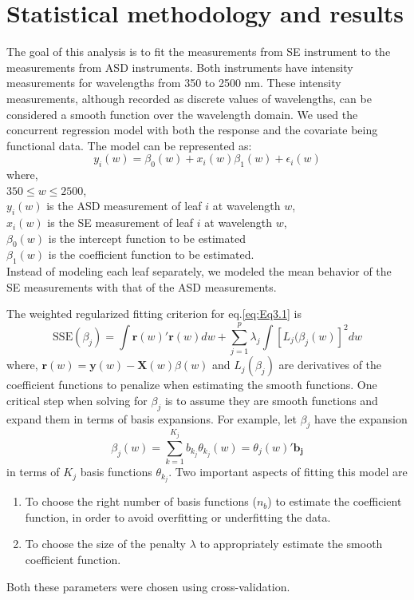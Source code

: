 \section*{Statistical methodology and results} \label{Sec_Methods}

The goal of this analysis is to fit the measurements from SE instrument to the measurements from ASD instruments. Both instruments have intensity measurements for wavelengths from 350 to 2500 nm. These intensity measurements, although recorded as discrete values of wavelengths, can be considered a smooth function over the wavelength domain. We used the concurrent regression model with both the response and the covariate being functional data. The model can be represented as:
\begin{equation}
y_i(w) = \beta_0(w) + x_i(w) \beta_1(w) + \epsilon_i(w) 
\label{eq:Eq3.1}
\end{equation} 
where, \\
$350 \leq w \leq 2500$, \\
$y_i(w)$ is the ASD measurement of leaf $i$ at wavelength $w$,\\ 
$x_i(w)$ is the SE measurement of leaf $i$ at wavelength $w$, \\
$\beta_0(w)$ is the intercept function to be estimated \\
$\beta_1(w)$ is the coefficient function to be estimated. \\
Instead of modeling each leaf separately, we modeled the mean behavior of the SE measurements with that of the ASD measurements. 

The weighted regularized fitting criterion for eq.\ref{eq:Eq3.1} is 
\[ \text{SSE}(\beta_j) = \int \mathbf{r}(w)'\mathbf{r}(w)dw + \sum \limits_{j = 1} ^p \lambda_j \int [L_j(\beta_j(w)]^2 dw  \]
where, $\mathbf{r}(w) = \mathbf{y}(w) - \mathbf{X}(w)\beta(w)$ and $L_j(\beta_j)$ are derivatives of the coefficient functions to penalize when estimating the smooth functions. One critical step when solving for $\beta_j$ is to assume they are smooth functions and expand them in terms of basis expansions. For example, let $\beta_j$ have the expansion
\[ \beta_j(w) = \sum \limits_{k = 1} ^{K_j} b_{k_j}\theta_{k_j} (w) = \theta_j(w)'\mathbf{b_j} \]
in terms of $K_j$ basis functions $\theta_{k_j}$. Two important aspects of fitting this model are
\begin{enumerate}
\item To choose the right number of basis functions ($n_b$) to estimate the coefficient function, in order to avoid overfitting or underfitting the data. 
\item To choose the size of the penalty $\lambda$ to appropriately estimate the smooth coefficient function.
\end{enumerate}
Both these parameters were chosen using cross-validation. 

